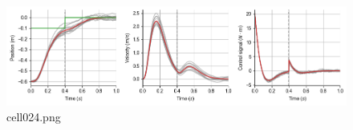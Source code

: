 \begin{figure}[ht]
	\centering
	\includegraphics[scale=0.8, max width=\linewidth]{./fig/motor-learning/infinite-horizon-ofc/cell024.png}
	\caption{cell024.png}
	\label{cell024.png}
\end{figure}